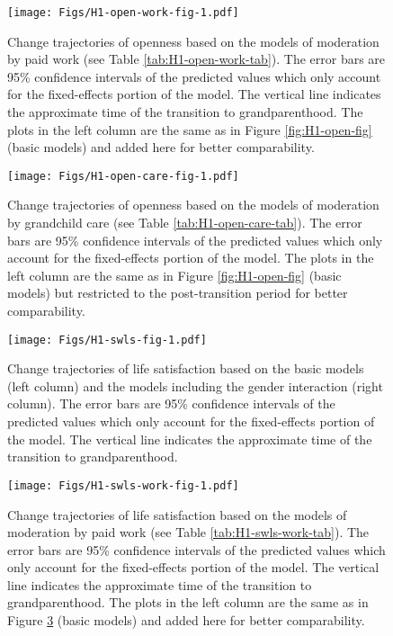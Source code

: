 \documentclass[
  english,
  man, noextraspace]{apa7}
\begin{document}
\begin{appendix}
\begin{figure}
\centering
\texttt{[image: Figs/H1-open-work-fig-1.pdf]}
\caption{\label{fig:H1-open-work-fig}Change trajectories of openness based on the
models of moderation by paid work (see Table
\ref{tab:H1-open-work-tab}). The error bars are 95\% confidence
intervals of the predicted values which only account for the
fixed-effects portion of the model. The vertical line indicates the
approximate time of the transition to grandparenthood. The plots in the
left column are the same as in Figure \ref{fig:H1-open-fig} (basic
models) and added here for better comparability.}
\end{figure}









\begin{figure}
\centering
\texttt{[image: Figs/H1-open-care-fig-1.pdf]}
\caption{\label{fig:H1-open-care-fig}Change trajectories of openness based on the
models of moderation by grandchild care (see Table
\ref{tab:H1-open-care-tab}). The error bars are 95\% confidence
intervals of the predicted values which only account for the
fixed-effects portion of the model. The plots in the left column are the
same as in Figure \ref{fig:H1-open-fig} (basic models) but restricted to
the post-transition period for better comparability.}
\end{figure}








\begin{figure}
\centering
\texttt{[image: Figs/H1-swls-fig-1.pdf]}
\caption{\label{fig:H1-swls-fig}Change trajectories of life satisfaction based on
the basic models (left column) and the models including the gender
interaction (right column). The error bars are 95\% confidence intervals
of the predicted values which only account for the fixed-effects portion
of the model. The vertical line indicates the approximate time of the
transition to grandparenthood.}
\end{figure}










\begin{figure}
\centering
\texttt{[image: Figs/H1-swls-work-fig-1.pdf]}
\caption{\label{fig:H1-swls-work-fig}Change trajectories of life satisfaction
based on the models of moderation by paid work (see Table
\ref{tab:H1-swls-work-tab}). The error bars are 95\% confidence
intervals of the predicted values which only account for the
fixed-effects portion of the model. The vertical line indicates the
approximate time of the transition to grandparenthood. The plots in the
left column are the same as in Figure \ref{fig:H1-swls-fig} (basic
models) and added here for better comparability.}
\end{figure}










\end{appendix}
\end{document}
